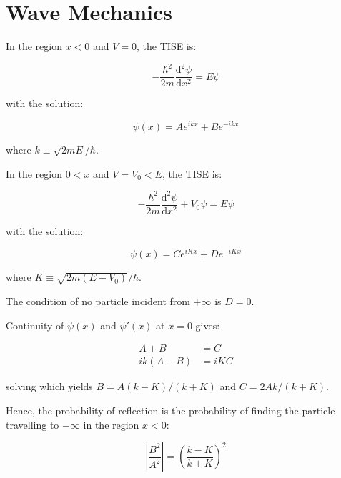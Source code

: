 \documentclass[12pt]{article}
\begin{document}
\pagebreak
\section*{Wave Mechanics}


In the region $x < 0$ and $V = 0$, the TISE is:

\begin{equation}
    -\frac{\hbar^{2}}{2m} \frac{\mathrm{d}^{2} \psi}{\mathrm{d}x^{2}} = E \psi
\end{equation}

with the solution:

\begin{equation}
    \psi(x) = Ae^{ikx} + Be^{-ikx}
\end{equation}

where $k \equiv \sqrt{2mE}/\hbar$.

In the region $0 < x$ and $V = V_{0} < E$, the TISE is:

\begin{equation}
    -\frac{\hbar^{2}}{2m} \frac{\mathrm{d}^{2} \psi}{\mathrm{d}x^{2}} + V_{0} \psi = E \psi
\end{equation}

with the solution:

\begin{equation}
    \psi(x) = Ce^{iKx} + De^{-iKx}
\end{equation}

where $K \equiv \sqrt{2m(E - V_{0})}/\hbar$.

The condition of no particle incident from $+\infty$ is $D = 0$.

Continuity of $\psi(x)$ and $\psi'(x)$ at $x = 0$ gives:

\begin{equation}
\begin{split}
    A + B &= C \\
    ik(A - B) &= iKC
\end{split}
\end{equation}

solving which yields $B = A(k - K)/(k + K)$ and $C = 2Ak/(k + K)$.

Hence, the probability of reflection is the probability of finding the particle travelling to $-\infty$ in the region $x < 0$:

\begin{equation}
    \left\lvert \frac{B^{2}}{A^{2}} \right\rvert = \left( \frac{k - K}{k + K} \right)^{2}
\end{equation}
\end{document}
